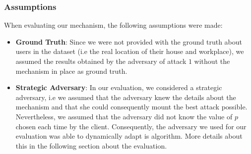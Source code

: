 \documentclass[10pt,conference,compsocconf]{IEEEtran}
\begin{document}
\subsubsection{Assumptions}
When evaluating our mechanism, the following assumptions were made:
\begin{itemize}
    \item \textbf{Ground Truth}: Since we were not provided with the ground truth about users in the dataset (i.e the real location of their house and workplace), we assumed the results obtained by the adversary of attack $1$ without the mechanism in place as ground truth.
    \item \textbf{Strategic Adversary}: In our evaluation, we considered a strategic adversary, i.e we assumed that the adversary knew the details about the mechanism and that she could consequently mount the best attack possible. Nevertheless, we assumed that the adversary did not know the value of $p$ chosen each time by the client.\newline
    Consequently, the adversary we used for our evaluation was able to dynamically adapt is algorithm. More details about this in the following section about the evaluation.
\end{itemize}
\end{document}
